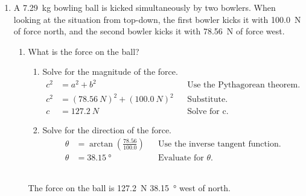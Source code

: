 \documentclass[letterpaper, 12pt]{report}
\begin{document}
\begin{enumerate}
\begin{enumerate}
        \item Substitute into $F=ma$ for force.
            \begin{align}
                F &= ma && \text{From Newton's second law.} \\
                F &= \SI{25.0}{kg} \cdot \SI{6.12e5}{\frac{m}{s^2}} && \text{Substitute.} \\
                F &= \SI{1.53e7}{N} && \text{Evaluate.}
            \end{align}
    \hfill
    \\
    The force exerted on the projectile is \SI{1.53e7}{N}.
    \\    
    \end{enumerate}
    \item A \SI{7.29}{kg} bowling ball is kicked simultaneously by two bowlers. When looking at the situation from top-down, the first bowler kicks it with \SI{100.0}{N} of force north, and the second bowler kicks it with \SI{78.56}{N} of force west.
        \begin{enumerate}
            \item What is the force on the ball?
                \begin{enumerate}
                    \item Solve for the magnitude of the force.
                    \begin{align}
                        c^2 &= a^2 + b^2 && \text{Use the Pythagorean theorem.} \\
                        c^2 &= (\SI{78.56}{N})^2 + (\SI{100.0}{N})^2 && \text{Substitute.} \\
                        c   &= \SI{127.2}{N} && \text{Solve for c.}
                    \end{align}
                    \item Solve for the direction of the force.
                    \begin{align}
                        \theta &= \arctan (\frac{78.56}{100.0}) && \text{Use the inverse tangent function.} \\
                        \theta &= \SI{38.15}{\degree} && \text{Evaluate for } \theta \text{.}
                    \end{align}
                \end{enumerate}
                    \hfill
                    \\
                    The force on the ball is \SI{127.2}{N} \SI{38.15}{\degree} west of north. \\

\end{enumerate}
\end{enumerate}
\end{document}
